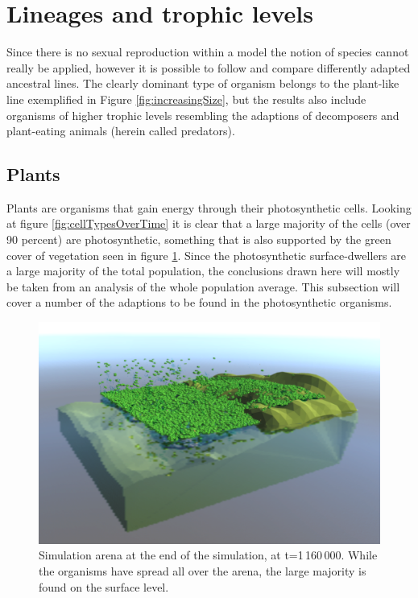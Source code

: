 \section{Lineages and trophic levels}
Since there is no sexual reproduction within a model the notion of species cannot really be applied, however it is possible to follow and compare differently adapted ancestral lines. The clearly dominant type of organism belongs to the plant-like line exemplified in Figure \ref{fig:increasingSize}, but the results also include organisms of higher trophic levels resembling the adaptions of decomposers and plant-eating animals (herein called predators).

\subsection{Plants}
Plants are organisms that gain energy through their photosynthetic cells. Looking at figure \ref{fig:cellTypesOverTime} it is clear that a large majority of the cells (over 90 percent) are photosynthetic, something that is also supported by the green cover of vegetation seen in figure \ref{fig:arenaAtEnd}. Since the photosynthetic surface-dwellers are a large majority of the total population, the conclusions drawn here will mostly be taken from an analysis of the whole population average. This subsection will cover a number of the adaptions to be found in the photosynthetic organisms.

\begin{figure}
  \begin{center}
  \includegraphics[width=\textwidth]{figure/arenaAtEnd}
  \caption{Simulation arena at the end of the simulation, at t=1\,160\,000. While the organisms have spread all over the arena, the large majority is found on the surface level.}
  \label{fig:arenaAtEnd}
  \end{center}
\end{figure}

